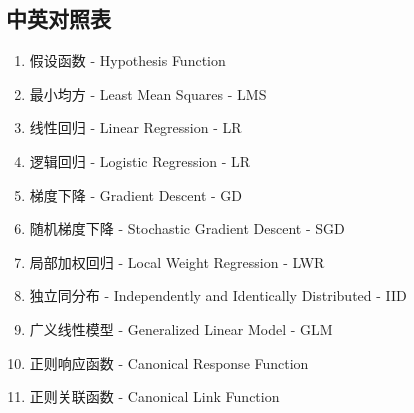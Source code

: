 \subsection{中英对照表}
\begin{enumerate}
	\item 假设函数 - Hypothesis Function
	\item 最小均方 - Least Mean Squares - LMS
	\item 线性回归 - Linear Regression - LR
	\item 逻辑回归 - Logistic Regression - LR
	\item 梯度下降 - Gradient Descent - GD
	\item 随机梯度下降 - Stochastic Gradient Descent - SGD
	\item 局部加权回归 - Local Weight Regression - LWR
	\item 独立同分布 - Independently and Identically Distributed - IID
	\item 广义线性模型 - Generalized Linear Model - GLM
	\item 正则响应函数 - Canonical Response Function
	\item 正则关联函数 - Canonical Link Function
\end{enumerate}
